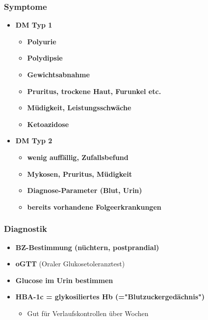 	\subsubsection{Symptome}
		\begin{itemize}
			\item \textbf{DM Typ 1}
				\begin{itemize}
					\item \textbf{Polyurie}
					\item \textbf{Polydipsie}
					\item \textbf{Gewichtsabnahme}
					\item \textbf{Pruritus, trockene Haut, Furunkel etc.}
					\item \textbf{Müdigkeit, Leistungsschwäche}
					\item \textbf{Ketoazidose}
				\end{itemize}		
			\item \textbf{DM Typ 2}
				\begin{itemize}
					\item \textbf{wenig auffällig, Zufallsbefund}
					\item \textbf{Mykosen, Pruritus, Müdigkeit}
					\item \textbf{Diagnose-Parameter (Blut, Urin)}
					\item \textbf{bereits vorhandene Folgeerkrankungen}
				\end{itemize}
		\end{itemize}
	\pagebreak
	\subsubsection{Diagnostik}
			\begin{itemize}
				\item \textbf{BZ-Bestimmung (nüchtern, postprandial)}
				\item \textbf{oGTT} (Oraler Glukosetoleranztest)
				\item \textbf{Glucose im Urin bestimmen}
				\item \textbf{HBA-1c = glykosiliertes Hb (="Blutzuckergedächnis")}
					\begin{itemize}
						\item Gut für Verlaufskontrollen über Wochen
					\end{itemize}
			\end{itemize}
